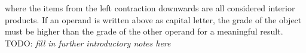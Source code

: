 where the items from the left contraction downwards are all considered interior products.
If an operand is written above as capital letter, the grade of the object must be higher
than the grade of the other operand for a meaningful result. \\


TODO: \emph{fill in further introductory notes here} \\

\newpage
